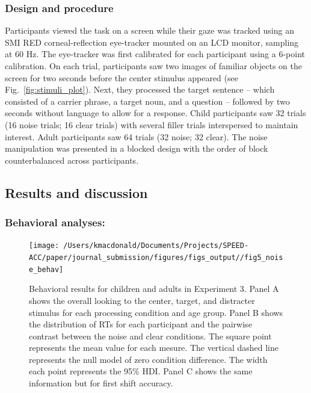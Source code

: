 \documentclass[english,floatsintext,man]{apa6}
\begin{document}
\hypertarget{design-and-procedure-2}{%
\subsubsection{Design and procedure}\label{design-and-procedure-2}}

Participants viewed the task on a screen while their gaze was tracked
using an SMI RED corneal-reflection eye-tracker mounted on an LCD
monitor, sampling at 60 Hz. The eye-tracker was first calibrated for
each participant using a 6-point calibration. On each trial,
participants saw two images of familiar objects on the screen for two
seconds before the center stimulus appeared (see
Fig.~\ref{fig:stimuli_plot}). Next, they processed the target sentence
-- which consisted of a carrier phrase, a target noun, and a question --
followed by two seconds without language to allow for a response. Child
participants saw 32 trials (16 noise trials; 16 clear trials) with
several filler trials interspersed to maintain interest. Adult
participants saw 64 trials (32 noise; 32 clear). The noise manipulation
was presented in a blocked design with the order of block
counterbalanced across participants.

\hypertarget{results-and-discussion-2}{%
\subsection{Results and discussion}\label{results-and-discussion-2}}

\hypertarget{behavioral-analyses-2}{%
\subsubsection{Behavioral analyses:}\label{behavioral-analyses-2}}

\begin{figure}[!t]

{\centering \texttt{[image: /Users/kmacdonald/Documents/Projects/SPEED-ACC/paper/journal\_submission/figures/figs\_output//fig5\_noise\_behav]} 

}

\caption{Behavioral results for children and adults in Experiment 3. Panel A shows the overall looking to the center, target, and distracter stimulus for each processing condition and age group. Panel B shows the distribution of RTs for each participant and the pairwise contrast between the noise and clear conditions. The square point represents the mean value for each mesure. The vertical dashed line represents the null model of zero condition difference. The width each point represents the 95\% HDI. Panel C shows the same information but for first shift accuracy.}\label{fig:noise-acc-rt}
\end{figure}
\end{document}
